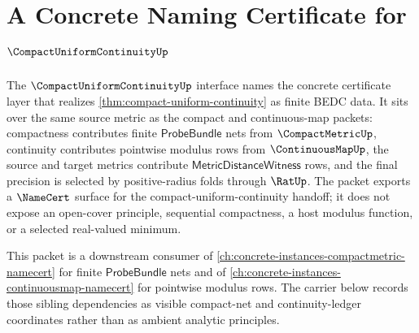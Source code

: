 \chapter{A Concrete Naming Certificate for $\CompactUniformContinuityUp$}
\label{ch:concrete-instances-compactuniformcontinuity-namecert}

The $\CompactUniformContinuityUp$ interface names the concrete certificate layer that realizes \autoref{thm:compact-uniform-continuity} as finite BEDC data. It sits over the same source metric as the compact and continuous-map packets: compactness contributes finite $\mathsf{ProbeBundle}$ nets from $\CompactMetricUp$, continuity contributes pointwise modulus rows from $\ContinuousMapUp$, the source and target metrics contribute $\mathsf{MetricDistanceWitness}$ rows, and the final precision is selected by positive-radius folds through $\RatUp$. The packet exports a $\NameCert$ surface for the compact-uniform-continuity handoff; it does not expose an open-cover principle, sequential compactness, a host modulus function, or a selected real-valued minimum.

This packet is a downstream consumer of \autoref{ch:concrete-instances-compactmetric-namecert} for finite $\mathsf{ProbeBundle}$ nets and of \autoref{ch:concrete-instances-continuousmap-namecert} for pointwise modulus rows. The carrier below records those sibling dependencies as visible compact-net and continuity-ledger coordinates rather than as ambient analytic principles.

